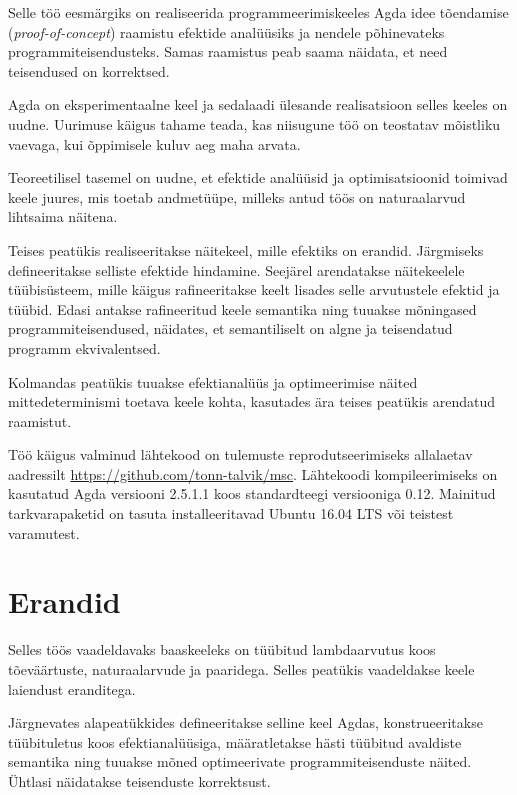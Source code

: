 \documentclass[a4paper,12pt]{article}
\begin{document}
Selle töö eesmärgiks on realiseerida programmeerimiskeeles Agda idee tõendamise (\emph{proof-of-concept}) 
raamistu efektide analüüsiks ja nendele põhinevateks programmiteisendusteks.
Samas raamistus peab saama näidata, et need teisendused on korrektsed.

Agda on eksperimentaalne keel ja sedalaadi ülesande realisatsioon selles keeles on uudne.
Uurimuse käigus tahame teada, kas niisugune töö on teostatav mõistliku vaevaga, kui õppimisele kuluv aeg maha arvata.

Teoreetilisel tasemel on uudne, et efektide analüüsid ja optimisatsioonid toimivad keele juures, mis toetab andmetüüpe, milleks antud töös on naturaalarvud lihtsaima näitena.

Teises peatükis realiseeritakse näitekeel, mille efektiks on erandid.
Järgmiseks defineeritakse selliste efektide hindamine.
Seejärel arendatakse näitekeelele tüübisüsteem, mille käigus rafineeritakse keelt lisades selle arvutustele efektid ja tüübid.
Edasi antakse rafineeritud keele semantika ning tuuakse mõningased programmiteisendused, näidates, et semantiliselt on algne ja teisendatud programm ekvivalentsed.

Kolmandas peatükis tuuakse efektianalüüs ja optimeerimise näited mittedeterminismi toetava keele kohta, kasutades ära teises peatükis arendatud raamistut.

Töö käigus valminud lähtekood on tulemuste reprodutseerimiseks allalaetav aadressilt \url{https://github.com/tonn-talvik/msc}.
Lähtekoodi kompileerimiseks on kasutatud Agda versiooni 2.5.1.1 koos standardteegi versiooniga 0.12.
Mainitud tarkvarapaketid on tasuta installeeritavad Ubuntu 16.04 LTS või teistest varamutest.

\clearpage\vspace*{0pt}

\section{Erandid}\label{sec:exc}

Selles töös vaadeldavaks baaskeeleks on tüübitud lambdaarvutus koos tõeväärtuste, naturaalarvude ja paaridega.
Selles peatükis vaadeldakse keele laiendust eranditega. 

Järgnevates alapeatükkides defineeritakse selline keel Agdas,
konstrueeritakse tüübituletus koos efektianalüüsiga,
määratletakse hästi tüübitud avaldiste semantika
ning tuuakse mõned optimeerivate programmiteisenduste näited.
Ühtlasi näidatakse teisenduste korrektsust.
\end{document}
